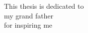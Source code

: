 \begin{dedication}
This thesis is dedicated to\\
 my grand father\\
for inspiring me\\
\end{dedication}